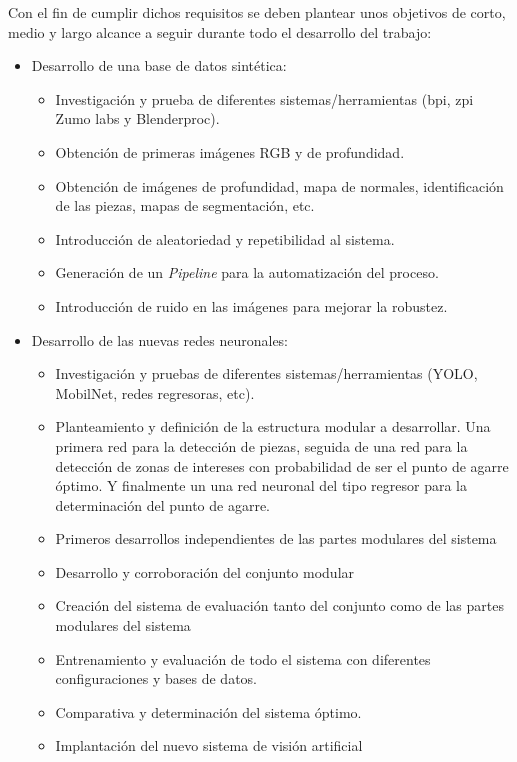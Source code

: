 Con el fin de cumplir dichos requisitos se deben plantear unos objetivos de corto, medio y largo alcance a seguir durante todo el desarrollo del trabajo:

\begin{itemize}
	\item Desarrollo de una base de datos sintética:
	\begin{itemize}
		\item Investigación y prueba de diferentes sistemas/herramientas (bpi, zpi Zumo labs y Blenderproc).
		\item Obtención de primeras imágenes RGB y de profundidad.
		\item Obtención de imágenes de profundidad, mapa de normales, identificación de las piezas, mapas de segmentación, etc.
		\item Introducción de aleatoriedad y repetibilidad al sistema.
		\item Generación de un \textit{Pipeline} para la automatización del proceso.
		\item Introducción de ruido en las imágenes para mejorar la robustez.
	\end{itemize}
	\item Desarrollo de las nuevas redes neuronales:
	\begin{itemize}
		\item Investigación y pruebas de diferentes sistemas/herramientas (YOLO, MobilNet, redes regresoras, etc).
		\item Planteamiento y definición de la estructura modular a desarrollar. Una primera red para la detección de piezas, seguida de una red para la detección de zonas de intereses con probabilidad de ser el punto de agarre óptimo. Y finalmente un una red neuronal del tipo regresor para la determinación del punto de agarre. 
		\item Primeros desarrollos independientes de las partes modulares del sistema
		\item Desarrollo y corroboración del conjunto modular
		\item Creación del sistema de evaluación tanto del conjunto como de las partes modulares del sistema
		\item Entrenamiento y evaluación de todo el sistema con diferentes configuraciones y bases de datos.
		\item Comparativa y determinación del sistema óptimo.
		\item Implantación del nuevo sistema de visión artificial
	\end{itemize}
\end{itemize}

